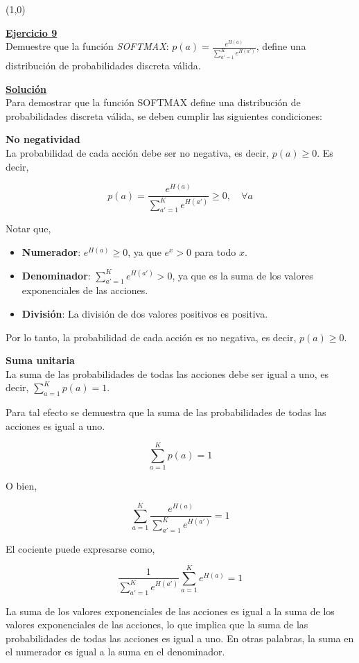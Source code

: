 \documentclass[12pt]{article}
\newlength\tindent
\renewcommand{\indent}{\hspace*{\tindent}}
\begin{document}
    \line(1,0){\textwidth}

    \indent\underline{\textbf{Ejercicio 9}}\\
    Demuestre que la función \textit{SOFTMAX}: $p(a)=\frac{e^{H(a)}}{\sum_{a'=1}^{K} e^{H(a')}}$, define una distribución de probabilidades discreta válida.

    \indent\underline{\textbf{Solución}}\\
    Para demostrar que la función SOFTMAX define una distribución de probabilidades discreta válida, se deben cumplir las siguientes condiciones:

    \textbf{No negatividad}\\
    La probabilidad de cada acción debe ser no negativa, es decir, $p(a) \geq 0$.
    Es decir,

    \[
        p(a) = \frac{e^{H(a)}}{\sum_{a'=1}^{K} e^{H(a')}} \geq 0, \quad \forall a
    \]

    Notar que,

    \begin{itemize}
        \item \textbf{Numerador}: $e^{H(a)} \geq 0$, ya que $e^{x} > 0$ para todo $x$.
        \item \textbf{Denominador}: $\sum_{a'=1}^{K} e^{H(a')} > 0$, ya que es la suma de los valores exponenciales de las acciones.
        \item \textbf{División}: La división de dos valores positivos es positiva.
    \end{itemize}

    Por lo tanto, la probabilidad de cada acción es no negativa, es decir, $p(a) \geq 0$.

    \textbf{Suma unitaria}\\
    La suma de las probabilidades de todas las acciones debe ser igual a uno, es decir, $\sum_{a=1}^{K} p(a) = 1$.

    Para tal efecto se demuestra que la suma de las probabilidades de todas las acciones es igual a uno.

    \[
        \sum_{a=1}^{K} p(a) = 1
    \]

    O bien,

    \[
        \sum_{a=1}^{K} \frac{e^{H(a)}}{\sum_{a'=1}^{K} e^{H(a')}} = 1
    \]

    El cociente puede expresarse como,

    \[
        \frac{1}{\sum_{a'=1}^{K} e^{H(a')}} \sum_{a=1}^{K} e^{H(a)} = 1
    \]

    La suma de los valores exponenciales de las acciones es igual a la suma de los valores exponenciales de las acciones, lo que implica que la suma de las probabilidades de todas las acciones es igual a uno.
    En otras palabras, la suma en el numerador es igual a la suma en el denominador.
\end{document}
